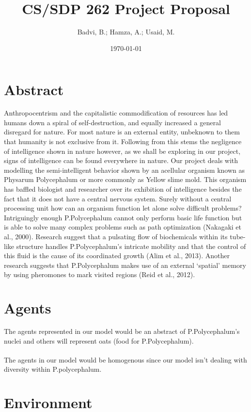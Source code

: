 \documentclass[11pt]{article}
\title{CS/SDP 262 Project Proposal}
\date{\today}
\author{Badvi, B.; Hamza, A.; Usaid, M.}
\begin{document}
\maketitle

\section{Abstract}
Anthropocentrism and the capitalistic commodification of resources has led humans down a spiral of self-destruction, and equally increased a general disregard for nature. For most nature is an external entity, unbeknown to them that humanity is not exclusive from it. Following from this stems the negligence of intelligence shown in nature however, as we shall be exploring in our project, signs of intelligence can be found everywhere in nature. Our project deals with modelling the semi-intelligent behavior shown by an acellular organism known as Physarum Polycephalum or more commonly as Yellow slime mold. This organism has baffled biologist and researcher over its exhibition of intelligence besides the fact that it does not have a central nervous system. Surely without a central processing unit how can an organism function let alone solve difficult problems? Intriguingly enough P.Polycephalum cannot only perform basic life function but is able to solve many complex problems such as path optimization (Nakagaki et al., 2000). Research suggest that a pulsating flow of biochemicals within its tube-like structure handles P.Polycephalum’s intricate mobility and that the control of this fluid is the cause of its coordinated growth (Alim et al., 2013). Another research suggests that P.Polycephalum makes use of an external ‘spatial’ memory by using pheromones to mark visited regions (Reid et al., 2012).

\section{Agents}

The agents represented in our model would be an abstract of P.Polycephalum’s nuclei and others will represent oats (food for P.Polycephalum).
\paragraph{}
The agents in our model would be homogenous since our model isn’t dealing with diversity within P.polycephalum.

\section{Environment}
\end{document}
